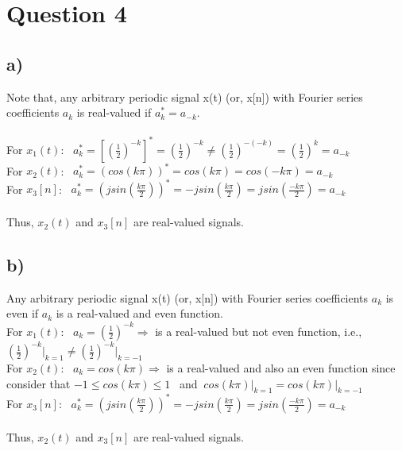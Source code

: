 \documentclass[12pt]{article}
\begin{document}
    \section*{Question 4}
    \subsection*{a)}
    Note that, any arbitrary periodic signal x(t) (or, x[n]) with Fourier series coefficients \(a_k\) is real-valued if  \(a^{*}_k = a_{-k}\). \\ \\
    For \(x_1(t)\): \ 
    \begin{math}
     a^{*}_k =  [(\frac{1}{2})^{-k}]^{*} = (\frac{1}{2})^{-k} \neq (\frac{1}{2})^{-(-k)}  = (\frac{1}{2})^{k} = a_{-k} \end{math} \\
    For \(x_2(t)\): \ 
    \begin{math}
     a^{*}_k =  (cos(k\pi))^{*} = cos(k\pi) = cos(-k\pi) = a_{-k} \end{math} \\
    For \(x_3[n]\): \ 
    \begin{math}
     a^{*}_k =  (jsin(\frac{k\pi}{2}))^{*} = -jsin(\frac{k\pi}{2})= jsin(\frac{-k\pi}{2}) = a_{-k} \end{math} \\ \\
    Thus, \(x_2(t)\) and \(x_3[n]\) are real-valued signals.
      
    \subsection*{b)}
    Any arbitrary periodic signal x(t) (or, x[n]) with Fourier series coefficients \(a_k\) is even if \(a_k\) is a real-valued and even function.\\
    For \(x_1(t)\): \ 
    \begin{math}
     a_k =  (\frac{1}{2})^{-k}  \Rightarrow \end{math} is a real-valued but not even function, i.e., \begin{math} (\frac{1}{2})^{-k} \Big|_{k=1} \neq (\frac{1}{2})^{-k} \Big|_{k=-1} \end{math}\\
    For \(x_2(t)\): \ 
    \begin{math}
     a_k =  cos(k\pi) \Rightarrow \end{math} is a real-valued and also an even function since consider that \begin{math} -1\leq cos(k\pi) \leq 1 \end{math} \ and \begin{math}\ cos(k\pi)\Big|_{k=1} = cos(k\pi)\Big|_{k=-1}\end{math} \\
    For \(x_3[n]\): \ 
    \begin{math}
     a^{*}_k =  (jsin(\frac{k\pi}{2}))^{*} = -jsin(\frac{k\pi}{2})= jsin(\frac{-k\pi}{2}) = a_{-k} \end{math} \\ \\
    Thus, \(x_2(t)\) and \(x_3[n]\) are real-valued signals.
      
\end{document}
